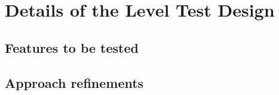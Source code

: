\chapter{Details of the Level Test Design} \label{chp:details-of-the-level-test-design}
	\begin{comment}
		Introduce the following subordinate sections. This section describes the features to be tested and any
		refinements to the test approach as required for the level. It also identifies the sets of test cases (highest
		level test cases) or scenarios along with the pass/fail criteria. It may also include the test deliverables.
	\end{comment}

\section{Features to be tested} \label{s:details-of-the-level-test-design:features-to-be-tested}
	\begin{comment}
		Identify the test items and describe the features and combinations of features that are the object of this
		LTD. Other features that may be exercised but that are not the specific object of this LTD need not be
		identified (e.g., a database management system that is supporting the reports that are being tested). The
		LTD provides more detailed information than the Level Test Plan. For example, identify an overall test
		architecture of all test scenarios, the individual scenarios, and the detailed test objectives within each
		scenario.
		For each feature or feature combination, a reference to its associated requirements in the item
		requirement and/or design description may be included. This may be documented in a Test
		Traceability Matrix (LTP Section 2.2).
	\end{comment}

\section{Approach refinements} \label{s:details-of-the-level-test-design:approach-refinements}
	\begin{comment}
		Specify refinements to the approach described in the corresponding Level Test Plan (if there is one;
		otherwise specify the entire approach). Include specific test techniques to be used. The method of
		analyzing test results should be identified (e.g., comparator tools, visual inspection, etc.).
		Summarize the common attributes of any test cases. This may include input constraints that must be
		true for every input in a set of associated test cases, any shared environmental needs, any shared
		special procedural requirements, and any shared case dependencies. Sets of associated test cases may
		be identified as scenarios (also commonly called scripts or suites). Test scenarios should be designed to
		be as reusable as possible for regression testing, revalidation testing for changes, and training new
		employees who must either use or support the system over time.
	\end{comment}

